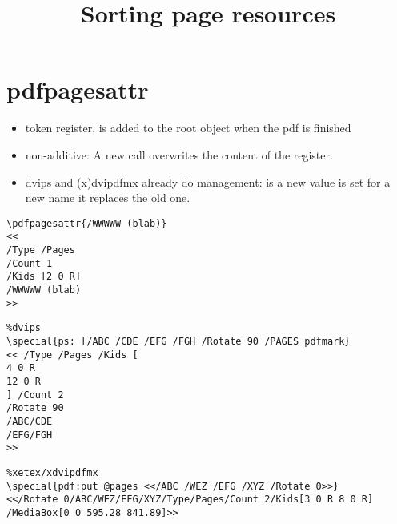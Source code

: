 \documentclass{article}
\begin{document}
\title{Sorting page resources}
\maketitle

\section{pdfpagesattr}
\begin{itemize}
\item token register, is added to the root object when the pdf is finished
\item non-additive: A new call overwrites the content of the register.
\item dvips and (x)dvipdfmx already do management: is a new value is set for a new name it replaces the old one.

\end{itemize}

\begin{verbatim}
\pdfpagesattr{/WWWWW (blab)}
<<
/Type /Pages
/Count 1
/Kids [2 0 R]
/WWWWW (blab)
>>
\end{verbatim}

\begin{verbatim}
%dvips
\special{ps: [/ABC /CDE /EFG /FGH /Rotate 90 /PAGES pdfmark}
<< /Type /Pages /Kids [
4 0 R
12 0 R
] /Count 2
/Rotate 90
/ABC/CDE
/EFG/FGH
>>
\end{verbatim}

\begin{verbatim}
%xetex/xdvipdfmx
\special{pdf:put @pages <</ABC /WEZ /EFG /XYZ /Rotate 0>>}
<</Rotate 0/ABC/WEZ/EFG/XYZ/Type/Pages/Count 2/Kids[3 0 R 8 0 R]
/MediaBox[0 0 595.28 841.89]>>
\end{verbatim}
\end{document}
